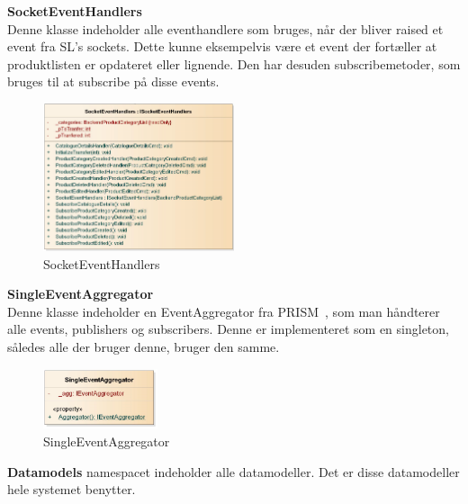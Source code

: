 \textbf{SocketEventHandlers}\\
Denne klasse indeholder alle eventhandlere som bruges, når der bliver raised et event fra \gls{SL}'s sockets. Dette kunne eksempelvis være et event der fortæller at produktlisten er opdateret eller lignende. Den har desuden subscribemetoder, som bruges til at subscribe på disse events.
\begin{center}
\begin{figure}[!h]
    \centering
    \includegraphics[width=0.50\textwidth]{Systemdesign/backend/klassebeskrivelser/Images/SocketEvents.png}
    \caption{SocketEventHandlers}
    \label{fig:modelhandler}
\end{figure}
\end{center}
\label{Modelhandler_Beskrivelse}
 \bigskip 
 
 
\textbf{SingleEventAggregator}\\
Denne klasse indeholder en EventAggregator fra PRISM~\cite{PRISM}, som man håndterer alle events, publishers og subscribers. Denne er implementeret som en singleton, således alle der bruger denne, bruger den samme.
\begin{center}
\begin{figure}[!h]
    \centering
    \includegraphics[width=0.30\textwidth]{Systemdesign/backend/klassebeskrivelser/Images/agg.png}
    \caption{SingleEventAggregator}
    \label{fig:modelhandler}
\end{figure}
\end{center}
\label{Modelhandler_Beskrivelse}
 \bigskip 

\bigskip
\bigskip

\textbf{Datamodels} namespacet indeholder alle datamodeller. Det er disse datamodeller hele systemet benytter.\\
\bigskip

